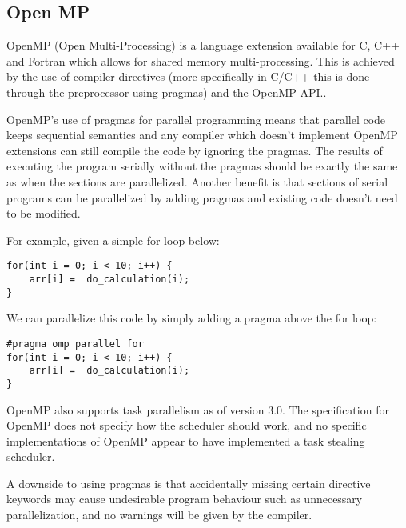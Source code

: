 \subsection{Open MP}

OpenMP (Open Multi-Processing) is a language extension available for C, C++ and Fortran which allows for shared memory multi-processing. 
This is achieved by the use of compiler directives (more specifically in C/C++ this is done through the preprocessor using pragmas) and
the OpenMP API.\cite{openmp}.

OpenMP's use of pragmas for parallel programming means that parallel code keeps sequential semantics
and any compiler which doesn't implement OpenMP extensions can still compile the code by ignoring the pragmas.
The results of executing the program serially without the pragmas should be exactly the same as when
the sections are parallelized. Another benefit is that sections of serial programs can be
parallelized by adding pragmas and existing code doesn't need to be modified.

For example, given a simple for loop below:

\begin{lstlisting}[style=myGPC]
for(int i = 0; i < 10; i++) {
    arr[i] =  do_calculation(i);
}
\end{lstlisting}

We can parallelize this code by simply adding a pragma above
the for loop:

\begin{lstlisting}[style=myGPC] 
#pragma omp parallel for
for(int i = 0; i < 10; i++) {
    arr[i] =  do_calculation(i);
}
\end{lstlisting}

OpenMP also supports task parallelism as of version 3.0\cite{openmp3}. The specification for OpenMP
does not specify how the scheduler should work, and no specific implementations of OpenMP appear to have 
implemented a task stealing scheduler.

A downside to using pragmas is that accidentally missing certain directive keywords may cause undesirable 
program behaviour such as unnecessary parallelization\cite{openmptraps}, and no warnings will be given by the compiler.

 
